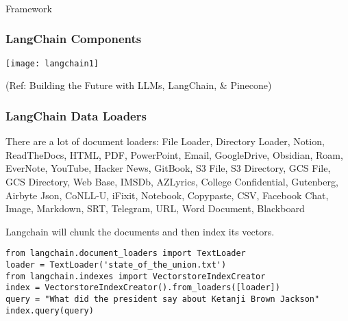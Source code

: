 \begin{frame}[fragile]\frametitle{}
\begin{center}
{\Large Framework}
\end{center}
\end{frame}

\begin{frame}[fragile]\frametitle{LangChain Components}

\begin{center}
\texttt{[image: langchain1]}
\end{center}	  

{\tiny (Ref: Building the Future with LLMs, LangChain, \& Pinecone)}
\end{frame}


\begin{frame}[fragile]\frametitle{LangChain Data Loaders}

There are a lot of document loaders: File Loader, Directory Loader, Notion, ReadTheDocs, HTML, PDF, PowerPoint, Email, GoogleDrive, Obsidian, Roam, EverNote, YouTube, Hacker News, GitBook, S3 File, S3 Directory, GCS File, GCS Directory, Web Base, IMSDb, AZLyrics, College Confidential, Gutenberg, Airbyte Json, CoNLL-U, iFixit, Notebook, Copypaste, CSV, Facebook Chat, Image, Markdown, SRT, Telegram, URL, Word Document, Blackboard

Langchain will chunk the documents and then index its vectors.

\begin{lstlisting}
from langchain.document_loaders import TextLoader
loader = TextLoader('state_of_the_union.txt')
from langchain.indexes import VectorstoreIndexCreator
index = VectorstoreIndexCreator().from_loaders([loader])
query = "What did the president say about Ketanji Brown Jackson"
index.query(query)
\end{lstlisting}	  

\end{frame}

